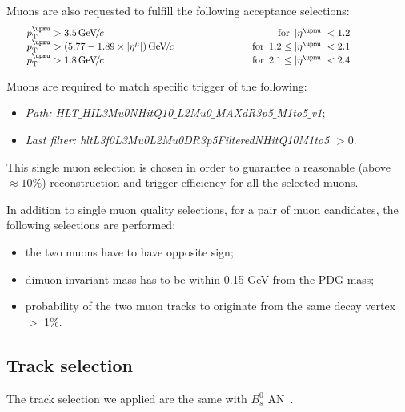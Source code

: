 Muons are also requested to fulfill the following acceptance selections:
\begin{equation}
\centering
\setlength\arraycolsep{20pt}
\begin{array}{l c r r}
\pt^{\PGm}>3.5\GeVc & & \text{for}\enspace \abs{\eta^{\PGm}}<1.2 & \\
\pt^{\PGm}>(5.77 - 1.89\times\abs{\eta^{\mu}})\GeVc & &  \text{for}\enspace 1.2\le\abs{\eta^{\PGm}}<2.1 &\\
\pt^{\PGm}>1.8\GeVc & & \text{for}\enspace 2.1\le\abs{\eta^{\PGm}}<2.4 &
\end{array}
\label{eq:SingleMuonAccCuts}
\end{equation}

Muons are required to match specific trigger of the following:
\begin{itemize}
\item \textit{Path: HLT$\_$HIL3Mu0NHitQ10$\_$L2Mu0$\_$MAXdR3p5$\_$M1to5$\_$v1}; \\
\item \textit{Last filter: hltL3f0L3Mu0L2Mu0DR3p5FilteredNHitQ10M1to5 $> 0$}.
\end{itemize}

This single muon selection is chosen in order to guarantee a reasonable (above $\approx10\%$) reconstruction and trigger efficiency for all the selected muons. %

In addition to single muon quality selections, for a pair of muon candidates, the following selections are performed:
\begin{itemize}
\item the two muons have to have opposite sign;
\item dimuon invariant mass has to be within 0.15 GeV from the PDG \Jpsi mass;
\item probability of the two muon tracks to originate from the same decay vertex $>$ 1\%.
\end{itemize}

\fi

\subsection {Track selection}
\label{sec:tracksel}
The track selection we applied are the same with $B^0_{s}$ AN~\cite{AN-19-055}.

\iffalse

Tracks were selected according to the following criteria, as recommended by the HIN tracking group:
\begin{itemize}
\item transverse momentum trkPt $> 0.9$, pseudorapidity $|\eta|$ $< 2.4$;
\item relative uncertainty on the track \pt, (trkPtError/trkPt) $< 0.1$;
\item sum of the numbers of Pixel and Strip hit $> 10$;
\item $\chi^2$ probability normalized by number of degrees of freedom and sum of the numbers of Pixel and Strip Layer hit $> 0.18$.
\end{itemize}

\fi

\clearpage
